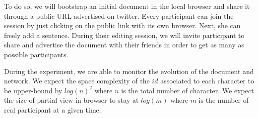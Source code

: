 To do so, we will bootstrap an initial document in the local browser
and share it through a public URL advertised on twitter. Every
participant can join the session by just clicking on the public link
with its own browser. Next, she can freely add a sentence. During
their editing session, we will invite participant to share and
advertise the document with their friends in order to get as many as
possible participants.

During the experiment, we are able to monitor the evolution of the
document and network. We expect the space complexity of the $id$
associated to each character to be upper-bound by $log(n)^2$ where $n$
is the total number of character. We expect the size of partial view
in browser to stay at $log(m)$ where $m$ is the number of real
participant at a given time.
 



